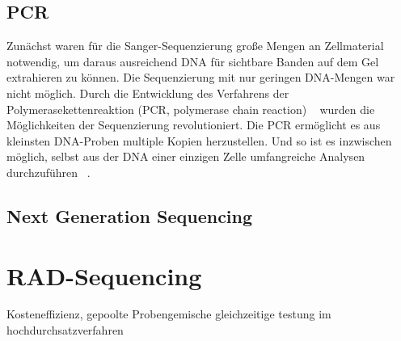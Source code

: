 \subsection{PCR}  \label{subsec:pcr}

Zunächst waren für die Sanger-Sequenzierung große Mengen an Zellmaterial notwendig, um daraus ausreichend DNA für sichtbare Banden auf dem Gel extrahieren zu können. Die Sequenzierung mit nur geringen DNA-Mengen war nicht möglich. Durch die Entwicklung des Verfahrens der Polymerasekettenreaktion (PCR, polymerase chain reaction) ~\cite{mullis_1986} wurden die Möglichkeiten der Sequenzierung revolutioniert. Die PCR ermöglicht es aus kleinsten DNA-Proben multiple Kopien herzustellen. Und so ist es inzwischen möglich, selbst aus der DNA einer einzigen Zelle umfangreiche Analysen durchzuführen ~\cite{gawad_2016}. \\



\subsection{Next Generation Sequencing} \label{subsec:ngs}

\section{RAD-Sequencing} \label{sec:rad}

Kosteneffizienz, gepoolte Probengemische gleichzeitige testung im hochdurchsatzverfahren
%
%
%
%
%
%
%
%
%
%
%

